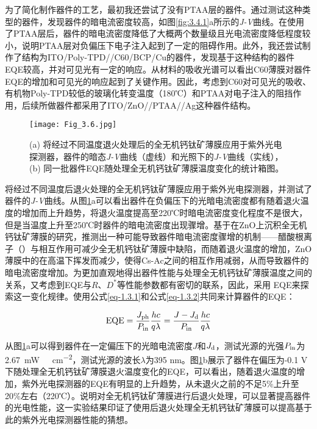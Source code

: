 \documentclass[forlib]{WHUMaster}   %
\begin{document}
{为了简化制作器件的工艺，最初我还尝试了没有PTAA层的器件。通过测试这种类型的器件，发现器件的暗电流密度较高，如图\ref{fig:3.4.1}a所示的\emph{J-V}曲线。在使用了PTAA层后，器件的暗电流密度降低了大概两个数量级且光电流密度降低程度较小，说明PTAA层对负偏压下电子注入起到了一定的阻碍作用。此外，我还尝试制作了结构为ITO/Poly-TPD//C60/BCP/Cu的器件，发现基于这种结构的器件EQE较高，并对可见光有一定的响应。从材料的吸收光谱可以看出C60薄膜对器件EQE的增加和可见光的响应起到了关键作用。因此，考虑到C60对可见光的吸收、有机物Poly-TPD较低的玻璃化转变温度（180℃）\cite{RN187}和PTAA对电子注入的阻挡作用，后续所做器件都采用了ITO/ZnO//PTAA//Ag这种器件结构。

\begin{figure}[ht]
\centering
  \texttt{[image: Fig\_3.6.jpg]}
  \caption{\rm (a) 将经过不同温度退火处理后的全无机钙钛矿薄膜应用于紫外光电探测器，器件的暗态\emph{J-V}曲线（虚线）和光照下的\emph{J-V}曲线（实线），(b) 同一批器件EQE随处理全无机钙钛矿薄膜温度变化的{\iffalse 平均值加标准误（SE）\fi}统计箱图。}
  \label{fig:3.6}
\end{figure}

将经过不同温度后退火处理的全无机钙钛矿薄膜应用于紫外光电探测器，并测试了器件的\emph{J-V}曲线。从图\ref{fig:3.6}a可以看出器件在负偏压下的光暗电流密度都有随着退火温度的增加而上升趋势，将退火温度提高至220℃时暗电流密度变化程度不是很大，但是当温度上升至250℃时器件的暗电流密度出现骤增。基于在ZnO上沉积全无机钙钛矿薄膜的研究，推测出一种可能导致器件暗电流密度骤增的机制——醋酸根离子（）与相互作用可减少全无机钙钛矿薄膜中缺陷，而随着退火温度的增加，ZnO薄膜中的在高温下挥发而减少，使得Cs-Ac之间的相互作用减弱，从而导致器件的暗电流密度增加\cite{RN93}。为更加直观地得出器件性能与处理全无机钙钛矿薄膜温度之间的关系，又考虑到EQE与$R$、$D^*$等性能参数都有密切的联系，因此，采用
EQE来探索这一变化规律。使用公式\ref{eq-1.3.1}和公式\ref{eq-1.3.2}共同来计算器件的EQE：

\begin{equation}\label{eq-3.1}
{\rm{EQE} }=  \frac{J_{\rm{ph}}}{P_{\rm{in}}}\frac{hc}{q\lambda} = \frac{{J}-{J_{\rm{d}}}}{P_{\rm{in}}}\frac{hc}{q\lambda}
\end{equation}

从图\ref{fig:3.6}a可以得到器件在一定偏压下的光暗电流密度$J$和$J_{\rm{d}}$，测试光源的光强$P_{\rm{in}}$为2.67\ \si{mW \ cm^{-2}}，测试光源的波长$\lambda$为395 nm。图\ref{fig:3.6}b展示了器件在偏压为-0.1 V下随处理全无机钙钛矿薄膜退火温度变化的EQE，可以看出，随着退火温度的增加，紫外光电探测器的EQE有明显的上升趋势，从未退火之前的不足5\%上升至20\%左右（220℃）。说明对全无机钙钛矿薄膜进行后退火处理，可以显著提高器件的光电性能，这一实验结果印证了使用后退火处理全无机钙钛矿薄膜可以提高基于此的紫外光电探测器性能的猜想。

}
\end{document}
